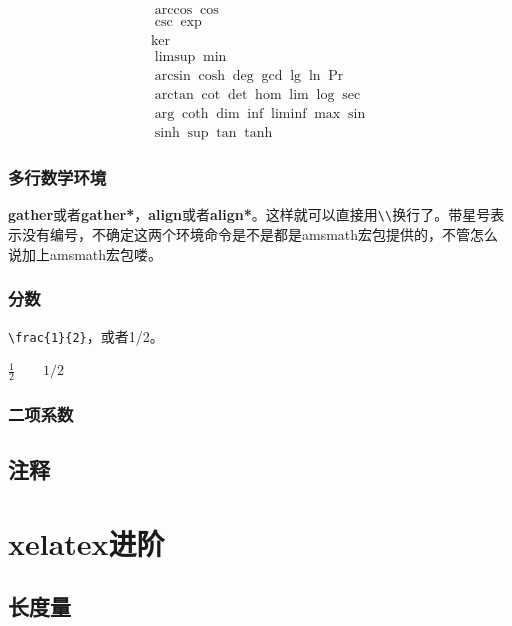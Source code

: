 \documentclass[11pt,oneside]{book}
\begin{document}
\begin{gather*}
\arccos \cos \\
\csc \exp \\
\ker \\
\limsup \min \\ 
\arcsin \cosh \deg \gcd \lg \ln \Pr \\ 
\arctan \cot \det \hom \lim \log \sec \\
\arg \coth \dim \inf \liminf \max \sin \\
\sinh \sup \tan \tanh
\end{gather*}

\section{多行数学环境}
\textbf{gather}或者\textbf{gather*}，\textbf{align}或者\textbf{align*}。这样就可以直接用\verb+\\+换行了。带星号表示没有编号，不确定这两个环境命令是不是都是amsmath宏包提供的，不管怎么说加上amsmath宏包喽。

\section{分数}
\verb+\frac{1}{2}+，或者1/2。

$\frac{1}{2} \qquad 1/2$

\section{二项系数}


\chapter{注释}
\showendnotes







\part{xelatex进阶}
\chapter{长度量}
\end{document}
